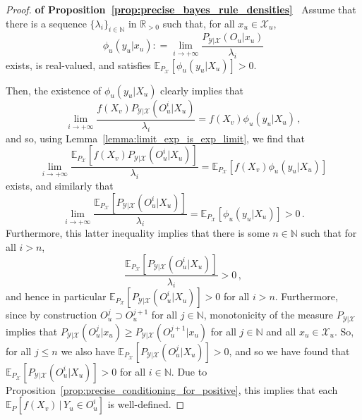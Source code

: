 \documentclass[twoside,11pt]{article}
\newcommand{\nats}{\mathbb{N}}
\newcommand{\reals}{\mathbb{R}}
\newcommand{\realspos}{\reals_{>0}}
\newcommand{\states}{\mathcal{X}}
\newcommand{\observs}{\mathcal{Y}}
\newcommand{\coloneqq}{:\!=}
\begin{document}
\begin{proof}{\bf of Proposition~\ref{prop:precise_bayes_rule_densities}~}
Assume that there is a sequence $\{\lambda_i\}_{i\in\nats}$ in $\realspos$ such that, for all $x_u\in\states_u$,
\begin{equation*}
\phi_u(y_u\vert x_u) \coloneqq \lim_{i\to+\infty}\frac{P_{\observs\vert\states}(O_u\vert x_u)}{\lambda_i}
\end{equation*}
exists, is real-valued, and satisfies $\mathbb{E}_{P_\states}[\phi_u(y_u\vert X_u)]>0$. 

Then, the existence of $\phi_u(y_u\vert X_u)$ clearly implies that
\begin{equation*}
\lim_{i\to+\infty} \frac{f(X_v)P_{\observs\vert\states}(O_u^i\vert X_u)}{\lambda_i} = f(X_v)\phi_u(y_u\vert X_u)\,,
\end{equation*}
and so, using Lemma~\ref{lemma:limit_exp_is_exp_limit}, we find that
\begin{equation*}
\lim_{i\to+\infty}\frac{\mathbb{E}_{P_\states}[f(X_v)P_{\observs\vert\states}(O_u^i\vert X_u)]}{\lambda_i} = \mathbb{E}_{P_\states}[f(X_v)\phi_u(y_u\vert X_u)]
\end{equation*}
exists, and similarly that
\begin{equation*}
\lim_{i\to+\infty}\frac{\mathbb{E}_{P_\states}[P_{\observs\vert\states}(O_u^i\vert X_u)]}{\lambda_i} = \mathbb{E}_{P_\states}[\phi_u(y_u\vert X_u)] > 0\,.
\end{equation*}
Furthermore, this latter inequality implies that there is some $n\in\nats$ such that for all $i>n$,
\begin{equation*}
\frac{\mathbb{E}_{P_\states}[P_{\observs\vert\states}(O_u^i\vert X_u)]}{\lambda_i} > 0\,,
\end{equation*}
and hence in particular $\mathbb{E}_{P_\states}[P_{\observs\vert\states}(O_u^i\vert X_u)]>0$ for all $i>n$. Furthermore, since by construction $O_u^j\supset O_u^{j+1}$ for all $j\in\nats$, monotonicity of the measure $P_{\observs\vert\states}$ implies that $P_{\observs\vert\states}(O_u^j\vert x_u) \geq P_{\observs\vert\states}(O_u^{j+1}\vert x_u)$ for all $j\in\nats$ and all $x_u\in\states_u$. So, for all $j\leq n$ we also have $\mathbb{E}_{P_\states}[P_{\observs\vert\states}(O_u^j\vert X_u)]>0$, and so we have found that $\mathbb{E}_{P_\states}[P_{\observs\vert\states}(O_u^i\vert X_u)]>0$ for all $i\in\nats$. Due to Proposition~\ref{prop:precise_conditioning_for_positive}, this implies that each $\mathbb{E}_P[f(X_v)\,\vert\,Y_u\in O_u^i]$ is well-defined.


\end{proof}
\end{document}
